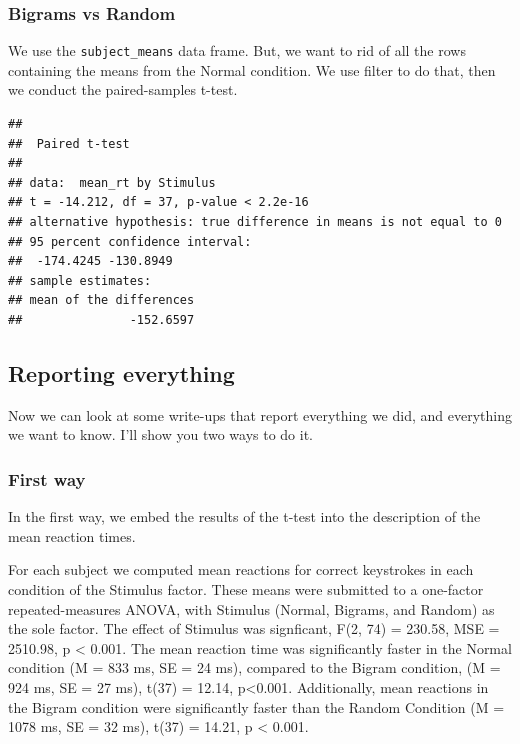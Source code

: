 \documentclass[]{book}
\newenvironment{Shaded}{\begin{snugshade}}{\end{snugshade}}
\newcommand{\KeywordTok}[1]{\textcolor[rgb]{0.13,0.29,0.53}{\textbf{{#1}}}}
\newcommand{\DataTypeTok}[1]{\textcolor[rgb]{0.13,0.29,0.53}{{#1}}}
\newcommand{\StringTok}[1]{\textcolor[rgb]{0.31,0.60,0.02}{{#1}}}
\newcommand{\OtherTok}[1]{\textcolor[rgb]{0.56,0.35,0.01}{{#1}}}
\newcommand{\NormalTok}[1]{{#1}}
\theoremstyle{definition}
\theoremstyle{definition}
\theoremstyle{definition}
\theoremstyle{remark}
\begin{document}
\subsubsection{Bigrams vs Random}\label{bigrams-vs-random}

We use the \texttt{subject\_means} data frame. But, we want to rid of
all the rows containing the means from the Normal condition. We use
filter to do that, then we conduct the paired-samples t-test.

\begin{Shaded}
\end{Shaded}

\begin{verbatim}
## 
##  Paired t-test
## 
## data:  mean_rt by Stimulus
## t = -14.212, df = 37, p-value < 2.2e-16
## alternative hypothesis: true difference in means is not equal to 0
## 95 percent confidence interval:
##  -174.4245 -130.8949
## sample estimates:
## mean of the differences 
##               -152.6597
\end{verbatim}

\subsection{Reporting everything}\label{reporting-everything}

Now we can look at some write-ups that report everything we did, and
everything we want to know. I'll show you two ways to do it.

\subsubsection{First way}\label{first-way}

In the first way, we embed the results of the t-test into the
description of the mean reaction times.

For each subject we computed mean reactions for correct keystrokes in
each condition of the Stimulus factor. These means were submitted to a
one-factor repeated-measures ANOVA, with Stimulus (Normal, Bigrams, and
Random) as the sole factor. The effect of Stimulus was signficant, F(2,
74) = 230.58, MSE = 2510.98, p \textless{} 0.001. The mean reaction time
was significantly faster in the Normal condition (M = 833 ms, SE = 24
ms), compared to the Bigram condition, (M = 924 ms, SE = 27 ms), t(37) =
12.14, p\textless{}0.001. Additionally, mean reactions in the Bigram
condition were significantly faster than the Random Condition (M = 1078
ms, SE = 32 ms), t(37) = 14.21, p \textless{} 0.001.
\end{document}
